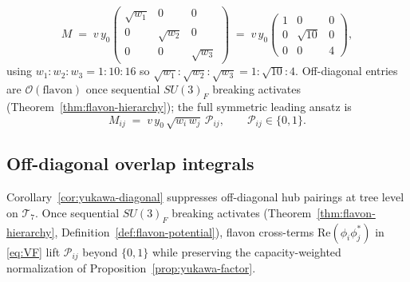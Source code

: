 \documentclass[11pt]{article}
\theoremstyle{plain}
\theoremstyle{definition}
\theoremstyle{remark}
\numberwithin{equation}{section}
\begin{document}
\begin{equation}\label{eq:mass-matrix-explicit}
  M
  \;=\;
  v\,y_0
  \begin{pmatrix}
    \sqrt{w_1} & 0 & 0 \\
    0 & \sqrt{w_2} & 0 \\
    0 & 0 & \sqrt{w_3}
  \end{pmatrix}
  \;=\;
  v\,y_0
  \begin{pmatrix}
    1 & 0 & 0 \\
    0 & \sqrt{10} & 0 \\
    0 & 0 & 4
  \end{pmatrix},
\end{equation}
using $w_1:w_2:w_3=1:10:16$ so $\sqrt{w_1}:\sqrt{w_2}:\sqrt{w_3}=1:\sqrt{10}:4$.
Off-diagonal entries are $\mathcal{O}(\text{flavon})$ once sequential
$SU(3)_F$ breaking activates (Theorem~\ref{thm:flavon-hierarchy}); the full
symmetric leading ansatz is
\begin{equation}\label{eq:mass-matrix-full}
  M_{ij} \;=\; v\,y_0\,\sqrt{w_i\,w_j}\,\mathcal{P}_{ij},
  \qquad
  \mathcal{P}_{ij}\in\{0,1\}.
\end{equation}

\subsection{Off-diagonal overlap integrals}
\label{sec:yukawa:offdiag}

Corollary~\ref{cor:yukawa-diagonal} suppresses off-diagonal hub pairings at
tree level on $\mathcal{T}_7$. Once sequential $SU(3)_F$ breaking activates
(Theorem~\ref{thm:flavon-hierarchy}, Definition~\ref{def:flavon-potential}), flavon
cross-terms $\mathrm{Re}(\phi_i\phi_j^*)$ in \eqref{eq:VF} lift
$\mathcal{P}_{ij}$ beyond $\{0,1\}$ while preserving the capacity-weighted
normalization of Proposition~\ref{prop:yukawa-factor}.
\end{document}
